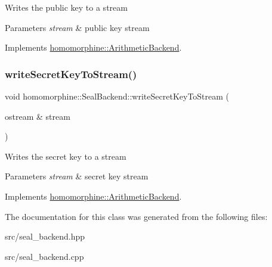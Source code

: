 Writes the public key to a stream


\begin{DoxyParams}{Parameters}
{\em stream} & public key stream \\
\hline
\end{DoxyParams}


Implements \hyperlink{classhomomorphine_1_1_arithmetic_backend_a2552b81a08e286969a0ff44428d59af4}{homomorphine\+::\+Arithmetic\+Backend}.

\mbox{\label{classhomomorphine_1_1_seal_backend_ab3420695131ae4c2a3891917480ddacf}} 
\subsubsection{\texorpdfstring{write\+Secret\+Key\+To\+Stream()}{writeSecretKeyToStream()}}
{\footnotesize\ttfamily void homomorphine\+::\+Seal\+Backend\+::write\+Secret\+Key\+To\+Stream (\begin{DoxyParamCaption}\item[{ostream \&}]{stream }\end{DoxyParamCaption})\hspace{0.3cm}{\ttfamily [virtual]}}

Writes the secret key to a stream


\begin{DoxyParams}{Parameters}
{\em stream} & secret key stream \\
\hline
\end{DoxyParams}


Implements \hyperlink{classhomomorphine_1_1_arithmetic_backend_ad88c797bbb2073ed3af460e568725c3f}{homomorphine\+::\+Arithmetic\+Backend}.



The documentation for this class was generated from the following files\+:\begin{DoxyCompactItemize}
\item 
src/seal\+\_\+backend.\+hpp\item 
src/seal\+\_\+backend.\+cpp\end{DoxyCompactItemize}
